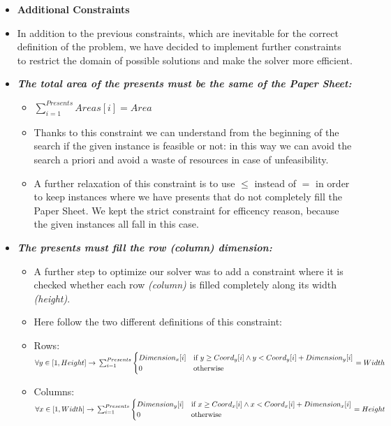 \begin{itemize}
	\item[] \textbf{Additional Constraints}
	\item[] In addition to the previous constraints, which are inevitable for the correct definition of the problem, we have decided to implement further constraints to restrict the domain of possible solutions and make the solver more efficient.
	\item \textbf{\textit{The total area of the presents must be the same of the Paper Sheet:}}
	\begin{itemize}
		\item[] $\sum_{i = 1}^{Presents}{Areas[i]} = Area$
		\item[] Thanks to this constraint we can understand from the beginning of the search if the given instance is feasible or not: in this way we can avoid the search a priori and avoid a waste of resources in case of unfeasibility.	
		\item[] A further relaxation of this constraint is to use $\leq$ instead of $=$ in order 
		to keep instances where we have presents that do not completely fill the Paper Sheet.  
		We kept the strict constraint for efficency reason, because the given instances all fall
		in this case.
	\end{itemize}
	\item \textbf{\textit{The presents must fill the row (column) dimension:}}
	\begin{itemize}
		\item[] A further step to optimize our solver was to add a constraint where it is checked whether each row \textit{(column)} is filled completely along its width \textit{(height)}.
		\item[] Here follow the two different definitions of this constraint:
		\item[] Rows: $
		\forall y \in [1, Height] \rightarrow\\ \sum_{i = 1}^{Presents}{
			\begin{cases}
				Dimension_x[i] & \text{if } y \geq Coord_y[i] \wedge y < Coord_y[i] + Dimension_y[i] \\
				0 & \text{otherwise}
			\end{cases}
		}\\= Width$
		\item[] Columns: $
		\forall x \in [1, Width] \rightarrow\\ \sum_{i = 1}^{Presents}{
			\begin{cases}
				Dimension_y[i] & \text{if } x \geq Coord_x[i] \wedge x < Coord_x[i] + Dimension_x[i] \\
				0 & \text{otherwise}
			\end{cases}
		}\\= Height$
	\end{itemize}
\end{itemize}

